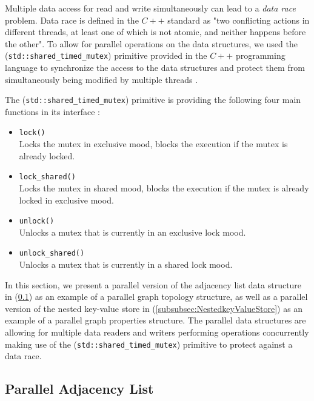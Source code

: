{Multiple data access for read and write simultaneously can lead to a \textit{data race} problem. Data race is defined in the $C++$ standard as "two conflicting actions in different threads, at least one of which is not atomic, and neither happens before the other". To allow for parallel operations on the data structures, we used the (\texttt{std::shared\_timed\_mutex}) primitive provided in the $C++$ programming language to synchronize the access to the data structures and protect them from simultaneously being modified by multiple threads \cite{josuttis2012c++}.

The (\texttt{std::shared\_timed\_mutex}) primitive is providing the following four main functions in its interface \cite{josuttis2012c++}:
\begin{itemize}  

\item{\texttt{lock()}}\\
Locks the mutex in exclusive mood, blocks the execution if the mutex is already locked.

\item{\texttt{lock\_shared()}}\\
Locks the mutex in shared mood, blocks the execution if the mutex is already locked in exclusive mood.

\item{\texttt{unlock()}}\\
Unlocks a mutex that is currently in an exclusive lock mood.

\item{\texttt{unlock\_shared()}}\\
Unlocks a mutex that is currently in a shared lock mood.

\end{itemize}

In this section, we present a parallel version of the adjacency list data structure in (\ref{subsec:PhyDesign-ParallelAdjacencyList}) as an example of a parallel graph topology structure, as well as a parallel version of the nested key-value store in (\ref{subsubsec:NestedkeyValueStore}) as an example of a parallel graph properties structure. The parallel data structures are allowing for multiple data readers and writers performing operations concurrently making use of the (\texttt{std::shared\_timed\_mutex}) primitive to protect against a data race.



\subsection{Parallel Adjacency List}
\label{subsec:PhyDesign-ParallelAdjacencyList}

}
